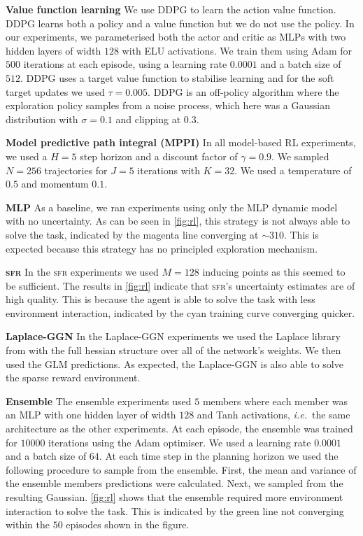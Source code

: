\documentclass{article} %
\makeatletter
\newcommand{\ie}{\textit{i.e.\@}\xspace}
\newcommand{\our}{\textsc{sfr}\xspace}
\makeatother
\begin{document}
\textbf{Value function learning}
We use DDPG to learn the action value function.
DDPG learns both a policy and a value function but we do not use the policy.
In our experiments, we parameterised both the actor and critic as MLPs with two hidden layers of width $128$ with ELU activations.
We train them using Adam for $500$ iterations at each episode, using a learning rate $0.0001$ and a batch size of $512$.
DDPG uses a target value function to stabilise learning and for the soft target updates
we used $\tau = 0.005$.
DDPG is an off-policy algorithm where the exploration policy samples from a noise process, which here was a Gaussian distribution with $\sigma=0.1$ and clipping at $0.3$.

\textbf{Model predictive path integral (MPPI)}
In all model-based RL experiments, we used a $H=5$ step horizon and a discount factor of $\gamma=0.9$.
We sampled $N=256$ trajectories for $J=5$ iterations with $K=32$.
We used a temperature of $0.5$ and momentum $0.1$.



\textbf{MLP}
As a baseline, we ran experiments using only the MLP dynamic model with no uncertainty.
As can be seen in \cref{fig:rl}, this strategy is not always able to solve the task, indicated by the magenta line converging at $\sim 310$.
This is expected because this strategy has no principled exploration mechanism.


\textbf{\our}
In the \our experiments we used $M=128$ inducing points as this seemed to be sufficient.
The results in \cref{fig:rl} indicate that \our's uncertainty estimates are of high quality.
This is because the agent is able to solve the task with less environment interaction, indicated
by the cyan training curve converging quicker.

\textbf{Laplace-GGN}
In the Laplace-GGN experiments we used the Laplace library from \cite{daxberger2021laplace}
with the full hessian structure over all of the network's weights.
We then used the GLM predictions.
As expected, the Laplace-GGN is also able to solve the sparse reward environment.


\textbf{Ensemble}
The ensemble experiments used $5$ members where each member was an MLP with one hidden layer of width $128$ and Tanh activations, \ie\ the same architecture as the other experiments.
At each episode, the ensemble was trained for $10000$ iterations using the Adam optimiser.
We used a learning rate $0.0001$ and a batch size of $64$.
At each time step in the planning horizon we used the following procedure to sample from the ensemble.
First, the mean and variance of the ensemble members predictions were calculated.
Next, we sampled from the resulting Gaussian.
\cref{fig:rl} shows that the ensemble required more environment interaction to solve the task.
This is indicated by the green line not converging within the $50$ episodes shown in the figure.
\end{document}
